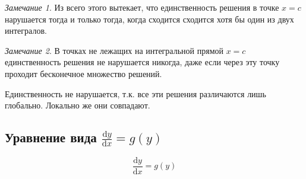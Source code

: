 \documentclass[a4paper,10pt]{report}
\newcommand{\ud}{\mathrm{d}}
\theoremstyle{definition}
\theoremstyle{remark}
\newtheorem{note}{Замечание}[section]
\theoremstyle{plain}
\begin{document}
\begin{note}
 Из всего этого вытекает, что единственность решения в точке $x = c$ нарушается тогда и только тогда, когда сходится сходится хотя бы один из двух интегралов.
\end{note}
\begin{note}
 В точках не лежащих на интегральной прямой $x = c$ единственность решения не нарушается никогда, даже если через эту точку проходит бесконечное множество решений.

 Единственность не нарушается, т.к. все эти решения различаются лишь глобально. Локально же они совпадают.
\end{note}

\subsection{Уравнение вида $\displaystyle\frac{\ud y}{\ud x} = g(y)$}
\begin{equation}
 \frac{\ud y}{\ud x} = g(y)
 \label{eq:dy/dx=g(y)}
\end{equation}
\end{document}
